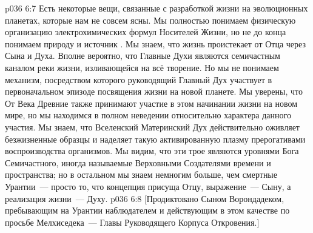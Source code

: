 \vs p036 6:7 \pc Есть некоторые вещи, связанные с разработкой жизни на эволюционных планетах, которые нам не совсем ясны. Мы полностью понимаем физическую организацию электрохимических формул Носителей Жизни, но не до конца понимаем природу и источник . Мы знаем, что жизнь проистекает от Отца через Сына и  Духа. Вполне вероятно, что Главные Духи являются семичастным каналом реки жизни, изливающейся на всё творение. Но мы не понимаем механизм, посредством которого руководящий Главный Дух участвует в первоначальном эпизоде посвящения жизни на новой планете. Мы уверены, что От Века Древние также принимают участие в этом начинании жизни на новом мире, но мы находимся в полном неведении относительно характера данного участия. Мы знаем, что Вселенский Материнский Дух действительно оживляет безжизненные образцы и наделяет такую активированную плазму прерогативами воспроизводства организмов. Мы видим, что эти трое являются уровнями Бога Семичастного, иногда называемые Верховными Создателями времени и пространства; но в остальном мы знаем немногим больше, чем смертные Урантии~--- просто то, что концепция присуща Отцу, выражение~--- Сыну, а реализация жизни~--- Духу.
\vsetoff
\vs p036 6:8 [Продиктовано Сыном Ворондадеком, пребывающим на Урантии наблюдателем и действующим в этом качестве по просьбе Мелхиседека~--- Главы Руководящего Корпуса Откровения.]
\quizlink
